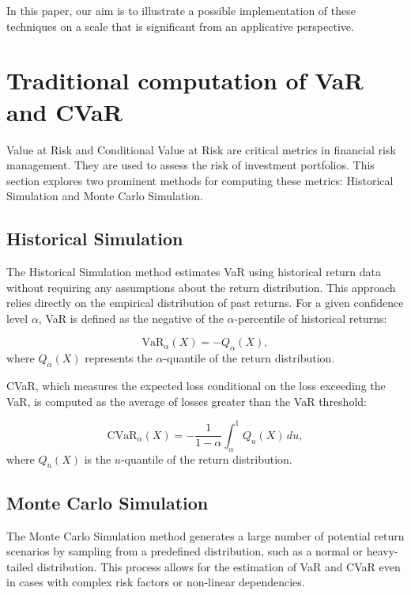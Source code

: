 \documentclass{article}
\begin{document}
In this paper, our aim is to illustrate a possible implementation of these techniques on a scale that is significant from an applicative perspective.

\section{Traditional computation of VaR and CVaR}
Value at Risk and Conditional Value at Risk are critical metrics in financial risk management. They are used to assess the risk of investment portfolios. This section explores two prominent methods for computing these metrics: Historical Simulation and Monte Carlo Simulation.

\subsection{Historical Simulation}
The Historical Simulation method estimates VaR using historical return data without requiring any assumptions about the return distribution. This approach relies directly on the empirical distribution of past returns. For a given confidence level $\alpha$, VaR is defined as the negative of the $\alpha$-percentile of historical returns:

\begin{equation}
\text{VaR}_{\alpha}(X) = - Q_{\alpha}(X),
\end{equation}
where $Q_{\alpha}(X)$ represents the $\alpha$-quantile of the return distribution.

CVaR, which measures the expected loss conditional on the loss exceeding the VaR, is computed as the average of losses greater than the VaR threshold:

\begin{equation}
\text{CVaR}_{\alpha}(X) = - \frac{1}{1-\alpha} \int_{\alpha}^{1} Q_{u}(X) \, du,
\end{equation}
where $Q_{u}(X)$ is the $u$-quantile of the return distribution.

\subsection{Monte Carlo Simulation}
The Monte Carlo Simulation method generates a large number of potential return scenarios by sampling from a predefined distribution, such as a normal or heavy-tailed distribution. This process allows for the estimation of VaR and CVaR even in cases with complex risk factors or non-linear dependencies.
\end{document}
